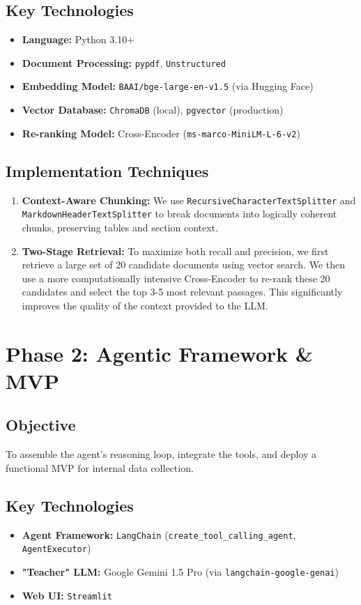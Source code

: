 \documentclass[11pt, a4paper]{article}
\begin{document}
\subsection{Key Technologies}
\begin{itemize}
    \item \textbf{Language:} Python 3.10+
    \item \textbf{Document Processing:} \texttt{pypdf}, \texttt{Unstructured}
    \item \textbf{Embedding Model:} \texttt{BAAI/bge-large-en-v1.5} (via Hugging Face)
    \item \textbf{Vector Database:} \texttt{ChromaDB} (local), \texttt{pgvector} (production)
    \item \textbf{Re-ranking Model:} Cross-Encoder (\texttt{ms-marco-MiniLM-L-6-v2})
\end{itemize}

\subsection{Implementation Techniques}
\begin{enumerate}
    \item \textbf{Context-Aware Chunking:} We use \texttt{RecursiveCharacterTextSplitter} and \texttt{MarkdownHeaderTextSplitter} to break documents into logically coherent chunks, preserving tables and section context.
    \item \textbf{Two-Stage Retrieval:} To maximize both recall and precision, we first retrieve a large set of 20 candidate documents using vector search. We then use a more computationally intensive Cross-Encoder to re-rank these 20 candidates and select the top 3-5 most relevant passages. This significantly improves the quality of the context provided to the LLM.
\end{enumerate}

\section{Phase 2: Agentic Framework \& MVP}
\subsection{Objective}
To assemble the agent's reasoning loop, integrate the tools, and deploy a functional MVP for internal data collection.

\subsection{Key Technologies}
\begin{itemize}
    \item \textbf{Agent Framework:} \texttt{LangChain} (\texttt{create\_tool\_calling\_agent}, \texttt{AgentExecutor})
    \item \textbf{"Teacher" LLM:} Google Gemini 1.5 Pro (via \texttt{langchain-google-genai})
    \item \textbf{Web UI:} \texttt{Streamlit}
\end{itemize}
\end{document}
